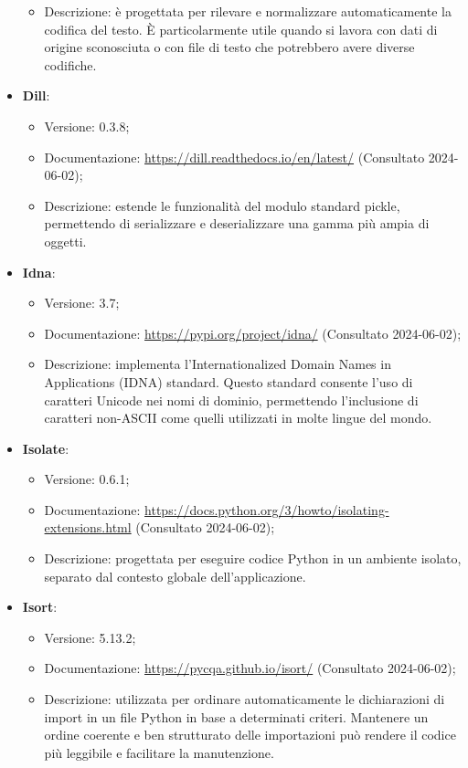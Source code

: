 \begin{itemize}
\begin{itemize}
        \item Descrizione: è progettata per rilevare e normalizzare automaticamente la codifica del testo. È particolarmente utile quando si lavora con dati di origine sconosciuta o con file di testo che potrebbero avere diverse codifiche.
    \end{itemize}
    \item \textbf{Dill}:
    \begin{itemize}
        \item Versione: 0.3.8;
        \item Documentazione: \url{https://dill.readthedocs.io/en/latest/} (Consultato 2024-06-02);
        \item Descrizione: estende le funzionalità del modulo standard pickle, permettendo di serializzare e deserializzare una gamma più ampia di oggetti.
    \end{itemize}
    \item \textbf{Idna}:
    \begin{itemize}
        \item Versione: 3.7;
        \item Documentazione: \url{https://pypi.org/project/idna/} (Consultato 2024-06-02);
        \item Descrizione: implementa l'Internationalized Domain Names in Applications (IDNA) standard. Questo standard consente l'uso di caratteri Unicode nei nomi di dominio, permettendo l'inclusione di caratteri non-ASCII come quelli utilizzati in molte lingue del mondo.
    \end{itemize}
    \item \textbf{Isolate}:
    \begin{itemize}
        \item Versione: 0.6.1;
        \item Documentazione: \url{https://docs.python.org/3/howto/isolating-extensions.html} (Consultato 2024-06-02);
        \item Descrizione: progettata per eseguire codice Python in un ambiente isolato, separato dal contesto globale dell'applicazione.
    \end{itemize}
    \item \textbf{Isort}:
    \begin{itemize}
        \item Versione: 5.13.2;
        \item Documentazione: \url{https://pycqa.github.io/isort/} (Consultato 2024-06-02);
        \item Descrizione: utilizzata per ordinare automaticamente le dichiarazioni di import in un file Python in base a determinati criteri. Mantenere un ordine coerente e ben strutturato delle importazioni può rendere il codice più leggibile e facilitare la manutenzione. 

\end{itemize}
\end{itemize}

